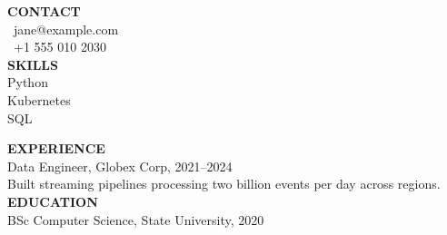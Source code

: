 \documentclass{article}
\begin{document}
\noindent\begin{minipage}[t]{0.3\textwidth}
\textbf{CONTACT}\\ \Letter\ jane@example.com\\ \Mobilefone\ +1 555 010 2030\\[1em]
\textbf{SKILLS}\\ Python\\ Kubernetes\\ SQL
\end{minipage}\hfill
\begin{minipage}[t]{0.65\textwidth}
\textbf{EXPERIENCE}\\ Data Engineer, Globex Corp, 2021--2024\\
Built streaming pipelines processing two billion events per day across regions.\\
\textbf{EDUCATION}\\ BSc Computer Science, State University, 2020
\end{minipage}
\end{document}
